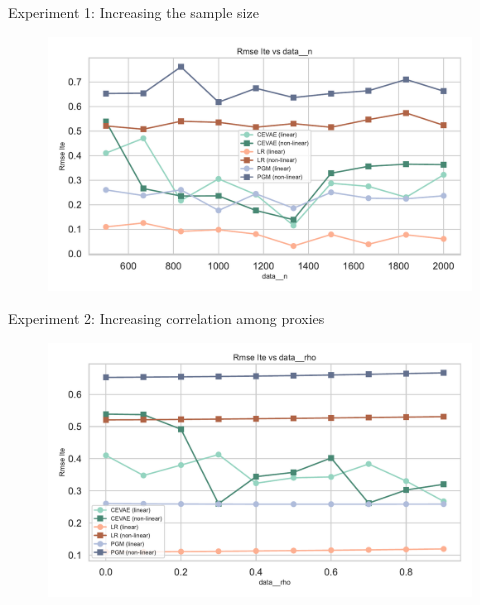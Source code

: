 \documentclass[10pt]{beamer}
\begin{document}
\begin{frame}{Experiment 1: Increasing the sample size}
  \begin{figure}[H]
      \includegraphics[width=\textwidth]{../src/results/MyRun_data__n--rmse_ite.pdf}
    \end{figure}
\end{frame}

\begin{frame}{Experiment 2: Increasing correlation among proxies}
  \begin{figure}[H]
      \includegraphics[width=\textwidth]{../src/results/MyRun_data__rho--rmse_ite.pdf}
    \end{figure}
\end{frame}
\end{document}
